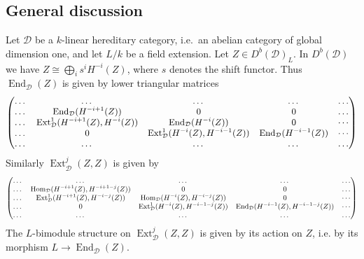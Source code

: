 \documentclass{amsart}
\numberwithin{equation}{section}
\let\cal\mathcal
\theoremstyle{definition}
\theoremstyle{remark}
\begin{document}
\subsection{General discussion}
\label{ref-5.2-28}
Let ${{\cal D}}$ be a $k$-linear hereditary category, i.e.\ an abelian category of global dimension one, and let $L/k$ be a field extension. Let $Z\in D^b({{\cal D}})_L$. 
In $D^b({{\cal D}})$ we have  $Z\cong\bigoplus_i s^i H^{-i}(Z)$, where $s$ denotes the shift functor.
Thus ${\operatorname {End}}_{{\cal D}}(Z)$ is given by lower triangular
matrices
\[
\small
\begin{pmatrix}
\dots& \dots &\dots &\dots &\dots\\
\dots& {\operatorname {End}}_{{\cal D}}(H^{-i+1}(Z)) &0 &0 &\dots\\
\dots&{\operatorname {Ext}}^1_{{\cal D}}(H^{-i+1}(Z),H^{-i}(Z)) &{\operatorname {End}}_{{\cal D}}(H^{-i}(Z)) & 0&\cdots\\
\dots & 0 &{\operatorname {Ext}}^1_{{\cal D}}(H^{-i}(Z),H^{-i-1}(Z)) & {\operatorname {End}}_{{\cal D}}(H^{-i-1}(Z)) &\cdots\\
\dots& \dots &\dots &\dots &\dots\\
\end{pmatrix}
\]
Similarly ${\operatorname {Ext}}^j_{{\cal D}}(Z,Z)$ is given by
\begin{equation}
\label{ref-5.2-29}
\small
\begin{pmatrix}
\dots& \dots &\dots &\dots &\dots\\
\dots& {\operatorname {Hom}}_{{\cal D}}(H^{-i+1}(Z),H^{-i+1-j}(Z)) &0 &0 &\dots\\
\dots&{\operatorname {Ext}}^1_{{\cal D}}(H^{-i+1}(Z),H^{-i-j}(Z)) &{\operatorname {Hom}}_{{\cal D}}(H^{-i}(Z),H^{-i-j}(Z)) & 0&\cdots\\
\dots & 0 &{\operatorname {Ext}}^1_{{\cal D}}(H^{-i}(Z),H^{-i-1-j}(Z)) & {\operatorname {End}}_{{\cal D}}(H^{-i-1}(Z),H^{-i-1-j}(Z)) &\cdots\\
\dots& \dots &\dots &\dots &\dots\\
\end{pmatrix}
\end{equation}
The $L$-bimodule structure on ${\operatorname {Ext}}^j_{{\cal D}}(Z,Z)$ is given by its
action on $Z$, i.e. by its morphism $L{\rightarrow} {\operatorname {End}}_{{\cal D}}(Z)$. 
\end{document}

